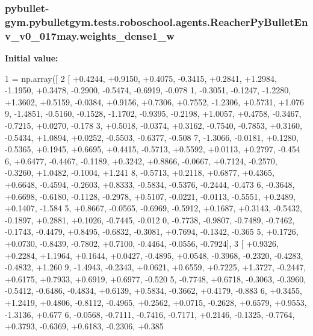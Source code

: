 \subsubsection[{\texorpdfstring{weights\+\_\+dense1\+\_\+w}{weights_dense1_w}}]{\setlength{\rightskip}{0pt plus 5cm}pybullet-\/gym.\+pybulletgym.\+tests.\+roboschool.\+agents.\+Reacher\+Py\+Bullet\+Env\+\_\+v0\+\_\+017may.\+weights\+\_\+dense1\+\_\+w}\hypertarget{namespacepybullet-gym_1_1pybulletgym_1_1tests_1_1roboschool_1_1agents_1_1_reacher_py_bullet_env__v0__017may_a5edecd860e1a352abd426ee5217f9181}{}\label{namespacepybullet-gym_1_1pybulletgym_1_1tests_1_1roboschool_1_1agents_1_1_reacher_py_bullet_env__v0__017may_a5edecd860e1a352abd426ee5217f9181}
{\bfseries Initial value\+:}
\begin{DoxyCode}
1 = np.array([
2 [ +0.4244, +0.9150, +0.4075, -0.3415, +0.2841, +1.2984, -1.1950, +0.3478, -0.2900, -0.5474, -0.6919, -0.078
      1, -0.3051, -0.1247, -1.2280, +1.3602, +0.5159, -0.0384, +0.9156, +0.7306, +0.7552, -1.2306, +0.5731, +1.076
      9, -1.4851, -0.5160, -0.1528, -1.1702, -0.9395, -0.2198, +1.0057, +0.4758, -0.3467, -0.7215, +0.0270, -0.178
      3, +0.5018, -0.0374, +0.3162, -0.7540, -0.7853, +0.3160, -0.5434, +1.0894, +0.0252, -0.5503, -0.6377, -0.508
      7, -1.3066, -0.0181, +0.1280, -0.5365, +0.1945, +0.6695, +0.4415, -0.5713, +0.5592, +0.0113, +0.2797, -0.454
      6, +0.6477, -0.4467, -0.1189, +0.3242, +0.8866, -0.0667, +0.7124, -0.2570, -0.3260, +1.0482, -0.1004, +1.241
      8, -0.5713, +0.2118, +0.6877, +0.4365, +0.6648, -0.4594, -0.2603, +0.8333, -0.5834, -0.5376, -0.2444, -0.473
      6, -0.3648, +0.6698, -0.6180, -0.1128, -0.2978, +0.5107, -0.0221, -0.0113, -0.5551, +0.2489, +0.1407, -1.584
      5, +0.8667, -0.0565, -0.6969, -0.5912, +0.1687, +0.3143, -0.5432, -0.1897, +0.2881, +0.1026, -0.7445, -0.012
      0, -0.7738, -0.9807, -0.7489, -0.7462, -0.1743, -0.4479, +0.8495, -0.6832, -0.3081, +0.7694, -0.1342, -0.365
      5, +0.1726, +0.0730, -0.8439, -0.7802, +0.7100, -0.4464, -0.0556, -0.7924],
3 [ +0.9326, +0.2284, +1.1964, +0.1644, +0.0427, -0.4895, +0.0548, -0.3968, -0.2320, -0.4283, -0.4832, +1.260
      9, -1.4943, -0.2343, +0.0621, +0.6559, +0.7225, +1.3727, -0.2447, +0.6175, +0.7933, +0.6919, +0.6977, -0.520
      5, -0.7748, +0.6718, -0.3063, -0.3960, -0.5412, -0.6486, -0.4834, +0.6139, +0.5834, -0.3662, +0.4179, -0.883
      6, +0.3455, +1.2419, +0.4806, -0.8112, -0.4965, +0.2562, +0.0715, -0.2628, +0.6579, +0.9553, -1.3136, +0.677
      6, -0.0568, -0.7111, -0.7416, -0.7171, +0.2146, -0.1325, -0.7764, +0.3793, -0.6369, +0.6183, -0.2306, +0.385

\end{DoxyCode}
